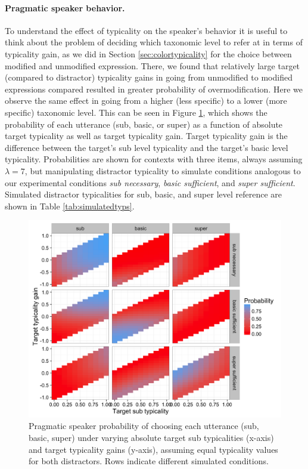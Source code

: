 \documentclass[11pt]{article}
\newcommand{\tableref}[1]{Table \ref{#1}}
\newcommand{\figref}[1]{Figure \ref{#1}}
\newcommand{\sectionref}[1]{Section \ref{#1}}
\begin{document}
\paragraph{Pragmatic speaker behavior.} To understand the effect of typicality on the speaker's behavior it is useful to think about the problem of deciding which taxonomic level to refer at in terms of typicality gain, as we did in \sectionref{sec:colortypicality} for the choice between modified and unmodified expression. There, we found that relatively large target (compared to distractor) typicality gains in going from unmodified to modified expressions compared resulted in greater probability of overmodification. Here we observe the same effect in going from a higher (less specific) to a lower (more specific) taxonomic level. This can be seen in \figref{fig:nominalspeakertypicality}, which shows the probability of each utterance (sub, basic, or super) as a function of absolute target typicality as well as target typicality gain. Target typicality gain is the difference between the target's sub level typicality and the target's basic level typicality. Probabilities are shown for contexts with three items, always assuming $\lambda = 7$, but manipulating distractor typicality to simulate conditions analogous to our experimental conditions \emph{sub necessary}, \emph{basic sufficient}, and \emph{super sufficient}. Simulated distractor typicalities for sub, basic, and super level reference are shown in \tableref{tab:simulatedtyps}.

\begin{figure}
\centering
\includegraphics[width=\textwidth]{../../../models/7_qualitative_nom_S1_typ/S1probs_typgainmap_alpha7.png}
\caption{Pragmatic speaker probability of choosing each utterance (sub, basic, super) under varying absolute target sub typicalities (x-axis) and target typicality gains (y-axis), assuming equal typicality values for both distractors. Rows indicate different simulated conditions.}
\label{fig:nominalspeakertypicality}
\end{figure}
\end{document}
